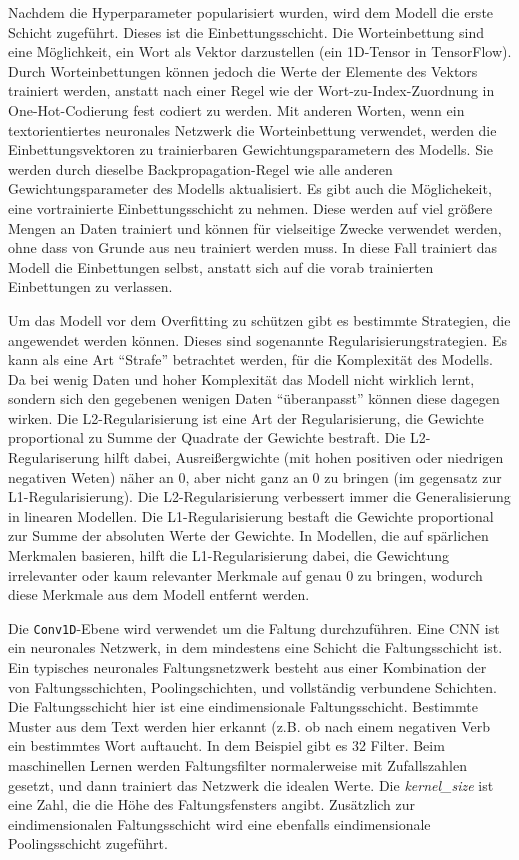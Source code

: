 Nachdem die Hyperparameter popularisiert wurden, wird dem Modell die erste Schicht zugeführt. Dieses ist die Einbettungsschicht. Die Worteinbettung sind eine Möglichkeit, ein Wort als Vektor darzustellen (ein 1D-Tensor in TensorFlow). Durch Worteinbettungen können jedoch die Werte der Elemente des Vektors trainiert werden, anstatt nach einer Regel wie der Wort-zu-Index-Zuordnung in One-Hot-Codierung fest codiert zu werden. Mit anderen Worten, wenn ein textorientiertes neuronales Netzwerk die Worteinbettung verwendet, werden die Einbettungsvektoren zu trainierbaren Gewichtungsparametern des Modells. Sie werden durch dieselbe Backpropagation-Regel wie alle anderen Gewichtungsparameter des Modells aktualisiert. Es gibt auch die Möglichekeit, eine vortrainierte Einbettungsschicht zu nehmen. Diese werden auf viel größere Mengen an Daten trainiert und können für vielseitige Zwecke verwendet werden, ohne dass von Grunde aus neu trainiert werden muss. In diese Fall trainiert das Modell die Einbettungen selbst, anstatt sich auf die vorab trainierten Einbettungen zu verlassen.


Um das Modell vor dem Overfitting zu schützen gibt es bestimmte Strategien, die angewendet werden können. Dieses sind sogenannte Regularisierungstrategien. Es kann als eine Art \enquote{Strafe} betrachtet werden, für die Komplexität des Modells. Da bei wenig Daten und hoher Komplexität das Modell nicht wirklich lernt, sondern sich den gegebenen wenigen Daten \enquote{überanpasst} können diese dagegen wirken. Die L2-Regularisierung ist eine Art der Regularisierung, die Gewichte proportional zu Summe der Quadrate der Gewichte bestraft. Die L2-Regulariserung hilft dabei, Ausreißergwichte (mit hohen positiven oder niedrigen negativen Weten) näher an 0, aber nicht ganz an 0 zu bringen (im gegensatz zur L1-Regularisierung). Die L2-Regularisierung verbessert immer die Generalisierung in linearen Modellen. Die L1-Regularisierung bestaft die Gewichte proportional zur Summe der absoluten Werte der Gewichte. In Modellen, die auf spärlichen Merkmalen basieren, hilft die L1-Regularisierung dabei, die Gewichtung irrelevanter oder kaum relevanter Merkmale auf genau 0 zu bringen, wodurch diese Merkmale aus dem Modell entfernt werden.

Die \texttt{Conv1D}-Ebene wird verwendet um die Faltung durchzuführen. Eine CNN ist ein neuronales Netzwerk, in dem mindestens eine Schicht die Faltungsschicht ist. Ein typisches neuronales Faltungsnetzwerk besteht aus einer Kombination der von Faltungsschichten, Poolingschichten, und vollständig verbundene Schichten. Die Faltungsschicht hier ist eine eindimensionale Faltungsschicht. Bestimmte Muster aus dem Text werden hier erkannt (z.B. ob nach einem negativen Verb ein bestimmtes Wort auftaucht. In dem Beispiel gibt es 32 Filter. Beim maschinellen Lernen werden Faltungsfilter normalerweise mit Zufallszahlen gesetzt, und dann trainiert das Netzwerk die idealen Werte. Die \textit{kernel\_size} ist eine Zahl, die die Höhe des Faltungsfensters angibt. Zusätzlich zur eindimensionalen Faltungsschicht wird eine ebenfalls eindimensionale Poolingsschicht zugeführt.


